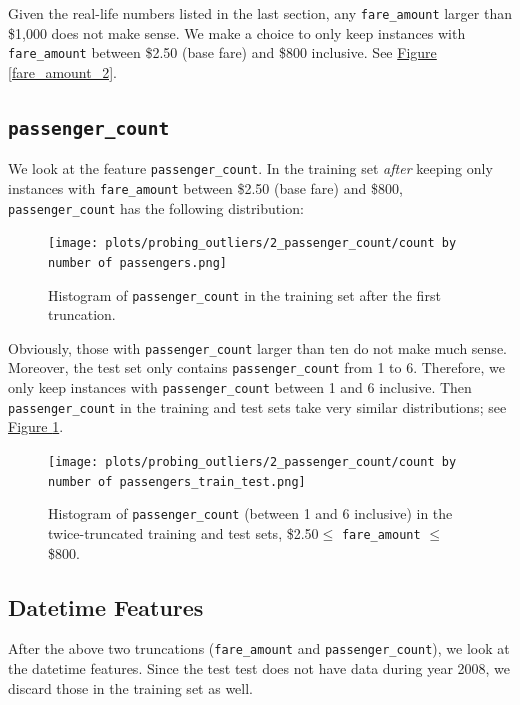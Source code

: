 \documentclass[12pt,letterpaper,final]{article}
\numberwithin{equation}{section}
\begin{document}
Given the real-life numbers listed in the last section, any \verb|fare_amount| larger than \$1,000 does not make sense. We make a choice to only keep instances with \verb|fare_amount| between \$2.50 (base fare) and \$800 inclusive. See \hyperref[fare_amount_2]{Figure \ref*{fare_amount_2}}.

\subsection{\texttt{passenger\_count}}

We look at the feature \verb|passenger_count|. In the training set \textit{after} keeping only instances with \verb|fare_amount| between \$2.50 (base fare) and \$800, \verb|passenger_count| has the following distribution:

\vspace*{-20pt}

\begin{figure}[H]
\begin{center}
\texttt{[image: plots/probing\_outliers/2\_passenger\_count/count by number of passengers.png]}
\caption{Histogram of \texttt{passenger\_count} in the training set after the first truncation.}
\end{center}
\end{figure}

\vspace*{-20pt}

Obviously, those with \verb|passenger_count| larger than ten do not make much sense. Moreover, the test set only contains \verb|passenger_count| from 1 to 6. Therefore, we only keep instances with \verb|passenger_count| between 1 and 6 inclusive. Then \verb|passenger_count| in the training and test sets take very similar distributions; see \hyperref[passengers_train_test]{Figure \ref*{passengers_train_test}}.

\begin{figure}[H]
\begin{center}
\texttt{[image: plots/probing\_outliers/2\_passenger\_count/count by number of passengers\_train\_test.png]}
\caption{Histogram of \texttt{passenger\_count} (between 1 and 6 inclusive) in the twice-truncated training and test sets, \$2.50$\leq$ \texttt{fare\_amount} $\leq$\$800.}\label{passengers_train_test}
\end{center}
\end{figure}

\subsection{Datetime Features}
After the above two truncations (\verb|fare_amount| and \verb|passenger_count|), we look at the datetime features. Since the test test does not have data during year 2008, we discard those in the training set as well.
\end{document}
